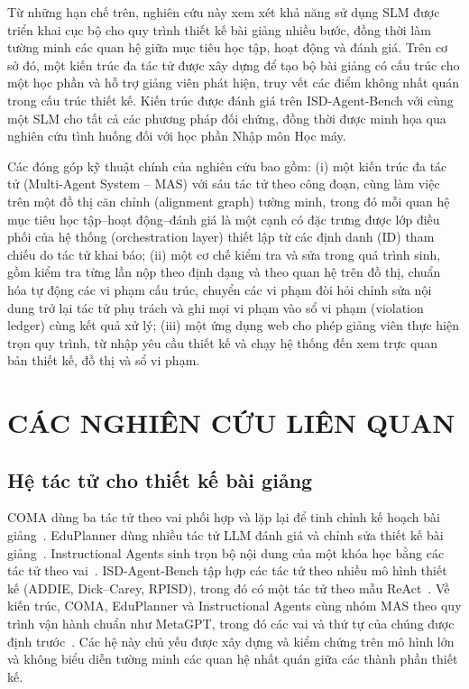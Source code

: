 \documentclass[conference,a4paper]{IEEEtran}
\begin{document}
Từ những hạn chế trên, nghiên cứu này xem xét khả năng sử dụng SLM được triển khai cục bộ cho quy
trình thiết kế bài giảng nhiều bước, đồng thời làm tường minh các quan hệ giữa mục tiêu học tập,
hoạt động và đánh giá. Trên cơ sở đó, một kiến trúc đa tác tử được xây dựng để tạo bộ bài giảng có cấu trúc cho
một học phần và hỗ trợ giảng viên phát hiện, truy vết các điểm không nhất quán trong cấu trúc thiết kế. Kiến trúc được đánh giá trên ISD-Agent-Bench với cùng một SLM cho
tất cả các phương pháp đối chứng, đồng thời được minh họa qua nghiên cứu tình huống đối với học phần
Nhập môn Học máy.

Các đóng góp kỹ thuật chính của nghiên cứu bao gồm: (i) một kiến trúc đa tác tử (Multi-Agent System --
MAS) với sáu tác tử theo công đoạn, cùng làm việc trên một đồ thị căn chỉnh (alignment graph) tường
minh, trong đó mỗi quan hệ mục tiêu học tập--hoạt động--đánh giá là một cạnh có đặc trưng được lớp điều phối của hệ thống
(orchestration layer) thiết lập từ các định danh (ID) tham chiếu do tác tử khai báo; (ii) một cơ chế kiểm tra và
sửa trong quá trình sinh, gồm kiểm tra từng lần nộp theo định dạng và theo quan hệ trên đồ thị, chuẩn
hóa tự động các vi phạm cấu trúc, chuyển các vi phạm đòi hỏi chỉnh sửa nội dung trở lại tác tử phụ trách và ghi mọi vi
phạm vào sổ vi phạm (violation ledger) cùng kết quả xử lý; (iii) một ứng dụng web cho phép giảng viên thực hiện trọn quy trình, từ nhập
yêu cầu thiết kế và chạy hệ thống đến xem trực quan bản thiết kế, đồ thị và sổ vi phạm.

\section{CÁC NGHIÊN CỨU LIÊN QUAN}
\label{sec:related}

\subsection{Hệ tác tử cho thiết kế bài giảng}
COMA dùng ba tác tử theo vai phối hợp và lặp lại để tinh chỉnh kế hoạch bài giảng~\cite{zeng2026coma}.
EduPlanner dùng nhiều tác tử LLM đánh giá và chỉnh sửa thiết kế bài giảng~\cite{zhang2025eduplanner}.
Instructional Agents sinh trọn bộ nội dung của một khóa học bằng các tác tử theo
vai~\cite{yao2025instructionalagents}. ISD-Agent-Bench tập hợp các tác tử theo nhiều mô hình
thiết kế (ADDIE, Dick--Carey, RPISD), trong đó có một tác tử theo mẫu ReAct~\cite{isdagentbench,yao2023react}. Về kiến trúc, COMA,
EduPlanner và Instructional Agents cùng nhóm MAS theo quy trình vận hành chuẩn như MetaGPT, trong đó các vai và thứ tự của
chúng được định trước~\cite{hong2024metagpt,guo2024mas}. Các hệ này chủ yếu được xây dựng và kiểm chứng
trên mô hình lớn và không biểu diễn tường minh các quan hệ nhất quán giữa các thành phần thiết kế.
\end{document}
